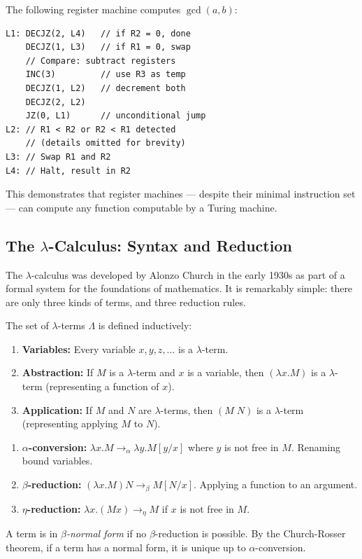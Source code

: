 \begin{example}
The following register machine computes $\gcd(a,b)$:
\begin{verbatim}
L1: DECJZ(2, L4)   // if R2 = 0, done
    DECJZ(1, L3)   // if R1 = 0, swap
    // Compare: subtract registers
    INC(3)         // use R3 as temp
    DECJZ(1, L2)   // decrement both
    DECJZ(2, L2)
    JZ(0, L1)      // unconditional jump
L2: // R1 < R2 or R2 < R1 detected
    // (details omitted for brevity)
L3: // Swap R1 and R2
L4: // Halt, result in R2
\end{verbatim}
This demonstrates that register machines --- despite their minimal instruction set --- can compute any function computable by a Turing machine.
\end{example}

\subsection{The \texorpdfstring{$\lambda$}{λ}-Calculus: Syntax and Reduction}
\label{sec:computation:lambda}

The $\lambda$-calculus was developed by Alonzo Church in the early 1930s as part of a formal system for the foundations of mathematics. It is remarkably simple: there are only three kinds of terms, and three reduction rules.

\begin{definition}
The set of $\lambda$-terms $\Lambda$ is defined inductively:
\begin{enumerate}
\item \textbf{Variables:} Every variable $x, y, z, \ldots$ is a $\lambda$-term.
\item \textbf{Abstraction:} If $M$ is a $\lambda$-term and $x$ is a variable, then $(\lambda x. M)$ is a $\lambda$-term (representing a function of $x$).
\item \textbf{Application:} If $M$ and $N$ are $\lambda$-terms, then $(M\; N)$ is a $\lambda$-term (representing applying $M$ to $N$).
\end{enumerate}
\end{definition}

\begin{definition}
\begin{enumerate}
\item \textbf{$\alpha$-conversion:} $\lambda x. M \to_\alpha \lambda y. M[y/x]$ where $y$ is not free in $M$. Renaming bound variables.
\item \textbf{$\beta$-reduction:} $(\lambda x. M) N \to_\beta M[N/x]$. Applying a function to an argument.
\item \textbf{$\eta$-reduction:} $\lambda x. (M x) \to_\eta M$ if $x$ is not free in $M$.
\end{enumerate}
A term is in \emph{$\beta$-normal form} if no $\beta$-reduction is possible. By the Church-Rosser theorem, if a term has a normal form, it is unique up to $\alpha$-conversion.
\end{definition}

